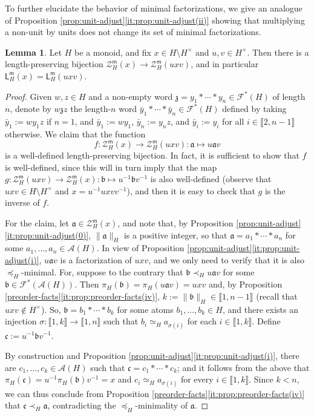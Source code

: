 \documentclass{report}
\newcommand{\llb}{\llbracket}
\newcommand{\rrb}{\rrbracket}
\newcommand{\m}{{\mathsf{m}}}
\renewcommand{\:}{\text{:}}
\theoremstyle{definition}
\newtheorem{lemma}[defn]{Lemma}
\begin{document}
%
To further elucidate the behavior of minimal factorizations, we give an analogue of Proposition \ref{prop:unit-adjust}\ref{it:prop:unit-adjust(ii)} showing that multiplying a non-unit by units does not change its set of minimal factorizations.
%
\begin{lemma}\label{lem:min-unit-adjust}
	Let $H$ be a monoid, and fix $x\in H\setminus H^\times$ and $u,v\in H^\times$.
	Then there is a length-preserving bijection $\mathcal{Z}_H^\m(x)\to\mathcal{Z}_H^\m(uxv)$, and in particular $\mathsf L_H^\m(x) = \mathsf L_H^\m(uxv)$.
\end{lemma}
\begin{proof}
	Given $w, z \in H$ and a non-empty word $\mathfrak{z} = y_1 \ast \cdots \ast y_n \in \mathscr F^\ast(H)$ of length $n$, denote by $w\mathfrak{z}z$ the length-$n$ word $\bar{y}_1 \ast \cdots \ast \bar{y}_n \in \mathscr F^\ast(H)$ defined by taking $\bar{y}_1 := w y_1 z$ if $n = 1$, and $\bar{y}_1:= wy_1$, $\bar{y}_n := y_nz$, and $\bar{y}_i := y_i$ for all $i\in \llb 2,n-1\rrb$ otherwise. 
	We claim that the function 
	$$
	f: \mathcal{Z}_H^\m(x) \to \mathcal{Z}_H^\m(uxv): \mathfrak a \mapsto u\mathfrak a v
	$$
	is a well-defined length-preserving bijection. 
	In fact, it is sufficient to show that $f$ is well-defined, since this will in turn imply that the map $g: \mathcal{Z}_H^\m(uxv)\to\mathcal{Z}_H^\m(x):\mathfrak{b}\mapsto u^{-1}\mathfrak{b}v^{-1}$ is also well-defined (observe that $uxv \in H \setminus H^\times$ and $x = u^{-1} uxv v^{-1}$), and then it is easy to check that $g$ is the inverse of $f$.
	
	For the claim, let $\mathfrak a \in \mathcal{Z}_H^\m(x)$, and note that, by Proposition \ref{prop:unit-adjust}\ref{it:prop:unit-adjust(0)}, $\|\mathfrak a\|_H$ is a positive integer, so that  $\mathfrak a = a_1 \ast \cdots \ast a_n$ for some $a_1, \ldots, a_n \in \mathscr A(H)$. 
	In view of Proposition \ref{prop:unit-adjust}\ref{it:prop:unit-adjust(i)}, $u\mathfrak{a}v$ is a factorization of $uxv$, and we only need to verify that it is also $\preceq_H$-minimal. For,
	suppose to the contrary that $\mathfrak b \prec_H u\mathfrak av$ for some $\mathfrak b \in \mathscr F^\ast(\mathscr A(H))$.
	Then $\pi_H(\mathfrak b) = \pi_H(u\mathfrak a v) = uxv$ and, by Proposition \ref{preorder-facts}\ref{it:prop:preorder-facts(iv)},
	$
	k := \|\mathfrak b\|_H \in \llb 1, n-1 \rrb
	$
	(recall that $uxv \notin H^\times$). So, $\mathfrak b = b_1 \ast \cdots \ast b_k$ for some atoms  $b_1, \ldots, b_k \in H$, and there exists an injection $\sigma: \llb 1, k \rrb \to \llb 1, n \rrb$ such that $b_i \simeq_H a_{\sigma(i)}$ for each $i \in \llb 1, k \rrb$.
	Define
	$
	\mathfrak{c} := u^{-1} \mathfrak b v^{-1}$. 
	
	By construction and Proposition \ref{prop:unit-adjust}\ref{it:prop:unit-adjust(i)}, there are  $c_1, \ldots, c_k \in \mathscr A(H)$ such that $\mathfrak c = c_1 \ast \cdots \ast c_k$; and it follows from the above that $\pi_H(\mathfrak c) = u^{-1} \pi_H(\mathfrak b) v^{-1} = x$ and $c_i \simeq_H a_{\sigma(i)}$ for every $i \in \llb 1, k \rrb$. Since $k < n$, we can thus conclude from Proposition \ref{preorder-facts}\ref{it:prop:preorder-facts(iv)} that $\mathfrak c \prec_H \mathfrak a$, contradicting the $\preceq_H$-minimality of $\mathfrak{a}$.
\end{proof}
\end{document}
